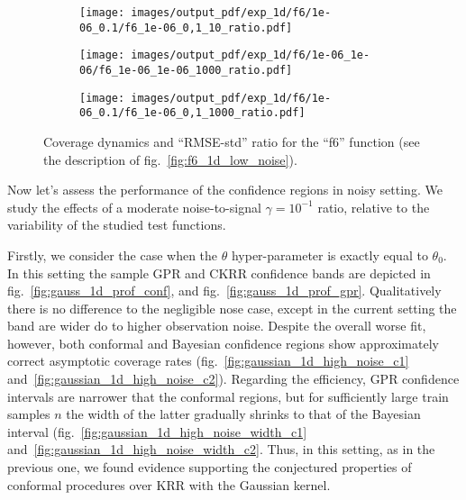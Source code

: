 \documentclass[a4paper,14pt]{extarticle}
\begin{document}
\begin{figure}
  \begin{subfigure}[b]{0.25\linewidth}
    \texttt{[image: images/output\_pdf/exp\_1d/f6/1e-06\_0.1/f6\_1e-06\_0,1\_10\_ratio.pdf]}
    \caption{} \label{fig:f6_1d_low_noise_arb_c2}
  \end{subfigure}%
  \begin{subfigure}[b]{0.25\linewidth}
    \texttt{[image: images/output\_pdf/exp\_1d/f6/1e-06\_1e-06/f6\_1e-06\_1e-06\_1000\_ratio.pdf]}
    \caption{} \label{fig:f6_1d_low_noise_arb_c3}
  \end{subfigure}%
  \begin{subfigure}[b]{0.25\linewidth}
    \texttt{[image: images/output\_pdf/exp\_1d/f6/1e-06\_0.1/f6\_1e-06\_0,1\_1000\_ratio.pdf]}
    \caption{} \label{fig:f6_1d_low_noise_arb_c4}
  \end{subfigure}%
  \caption{Coverage dynamics and ``RMSE-std'' ratio for the ``f6'' function (see
  the description of fig.~\ref{fig:f6_1d_low_noise}).}
  \label{fig:f6_1d_low_noise_arb}
\end{figure}

Now let's assess the performance of the confidence regions in noisy setting. We
study the effects of a moderate noise-to-signal $\gamma=10^{-1}$ ratio, relative
to the variability of the studied test functions.

Firstly, we consider the case when the $\theta$ hyper-parameter is exactly equal
to $\theta_0$. In this setting the sample GPR and CKRR confidence bands are depicted
in fig.~\ref{fig:gauss_1d_prof_conf}, and fig.~\ref{fig:gauss_1d_prof_gpr}.
Qualitatively there is no difference to the negligible nose case, except in the current
setting the band are wider do to higher observation noise. Despite the overall worse
fit, however, both conformal and Bayesian confidence regions show approximately correct
asymptotic coverage rates (fig.~\ref{fig:gaussian_1d_high_noise_c1} and~\ref{fig:gaussian_1d_high_noise_c2}).
Regarding the efficiency, GPR confidence intervals are narrower that the conformal
regions, but for sufficiently large train samples $n$ the width of the latter gradually
shrinks to that of the Bayesian interval (fig.~\ref{fig:gaussian_1d_high_noise_width_c1}
and~\ref{fig:gaussian_1d_high_noise_width_c2}. Thus, in this setting, as in the
previous one, we found evidence supporting the conjectured properties of conformal
procedures over KRR with the Gaussian kernel.
\end{document}
